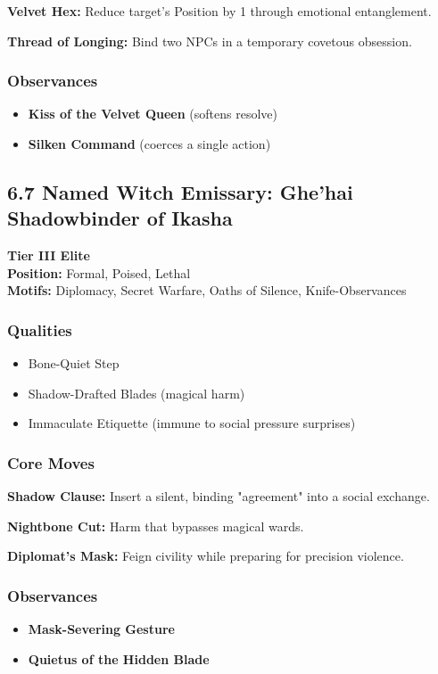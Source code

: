\documentclass[11pt]{book}
\begin{document}
\textbf{Velvet Hex:} Reduce target's Position by 1 through emotional entanglement.

\textbf{Thread of Longing:} Bind two NPCs in a temporary covetous obsession.

\subsubsection*{Observances}
\begin{itemize}
    \item \textbf{Kiss of the Velvet Queen} (softens resolve)
    \item \textbf{Silken Command} (coerces a single action)
\end{itemize}

\subsection{6.7 Named Witch Emissary: Ghe'hai Shadowbinder of Ikasha}

\textbf{Tier III Elite} \\
\textbf{Position:} Formal, Poised, Lethal \\
\textbf{Motifs:} Diplomacy, Secret Warfare, Oaths of Silence, Knife-Observances

\subsubsection*{Qualities}
\begin{itemize}[leftmargin=*]
    \item Bone-Quiet Step
    \item Shadow-Drafted Blades (magical harm)
    \item Immaculate Etiquette (immune to social pressure surprises)
\end{itemize}

\subsubsection*{Core Moves}
\textbf{Shadow Clause:} Insert a silent, binding "agreement" into a social exchange.

\textbf{Nightbone Cut:} Harm that bypasses magical wards.

\textbf{Diplomat's Mask:} Feign civility while preparing for precision violence.

\subsubsection*{Observances}
\begin{itemize}
    \item \textbf{Mask-Severing Gesture}
    \item \textbf{Quietus of the Hidden Blade}
\end{itemize}
\end{document}
